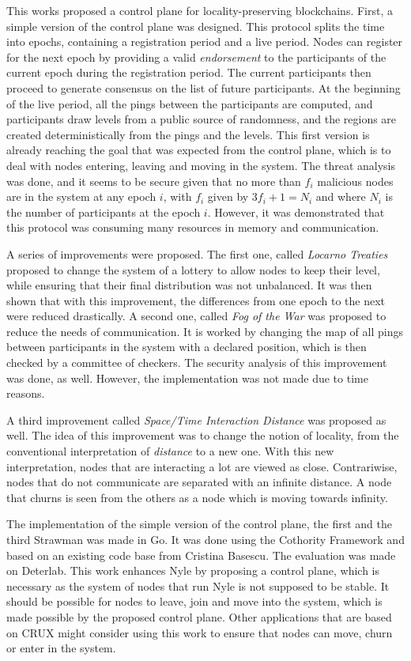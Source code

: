 \documentclass[a4paper,11pt,twoside,openright]{report}
\begin{document}
This works proposed a control plane for locality-preserving blockchains. First,
a simple version of the control plane was designed. This protocol splits the
time into epochs, containing a registration period and a live period. Nodes can
register for the next epoch by providing a valid \textit{endorsement} to the
participants of the current epoch during the registration period. The current
participants then proceed to generate consensus on the list of future
participants. At the beginning of the live period, all the pings between the
participants are computed, and participants draw levels from a public source of
randomness, and the regions are created deterministically from the pings and
the levels. This first version is already reaching the goal that was expected
from the control plane, which is to deal with nodes entering, leaving and
moving in the system. The threat analysis was done, and it seems to be secure
given that no more than $f_i$ malicious nodes are in the system at any epoch
$i$, with $f_i$ given by $3f_i+1=N_i$ and where $N_i$ is the number of
participants at the epoch $i$. However, it was demonstrated that this protocol
was consuming many resources in memory and communication. 

A series of improvements were proposed. The first one, called \textit{Locarno
Treaties} proposed to change the system of a lottery to allow nodes to keep
their level, while ensuring that their final distribution was not unbalanced.
It was then shown that with this improvement, the differences from one epoch to
the next were reduced drastically. A second one, called \textit{Fog of the War}
was proposed to reduce the needs of communication. It is worked by changing the
map of all pings between participants in the system with a declared position,
which is then checked by a committee of checkers. The security analysis of this
improvement was done, as well. However,  the implementation was not made due to time
reasons. 

A third improvement called \textit{Space/Time Interaction Distance} was
proposed as well. The idea of this improvement was to change the notion of
locality, from the conventional interpretation of \textit{distance} to a new one.
With this new interpretation, nodes that are interacting a lot are viewed as
close. Contrariwise, nodes that do not communicate are separated with an
infinite distance. A node that churns is seen from
the others as a node which is moving towards infinity.  

The implementation of the simple version of the control plane, the first and
the third Strawman was made in Go. It was done using the Cothority Framework
and based on an existing code base from Cristina Basescu. The evaluation was
made on Deterlab. This work enhances Nyle by proposing a control plane, which
is necessary as the system of nodes that run Nyle is not supposed to be
stable. It should be possible for nodes to leave, join and move into the
system, which is made possible by the proposed control plane. Other
applications that are based on CRUX \cite{Basescu2014} might consider using
this work to ensure that nodes can move, churn or enter in the system.
\end{document}
